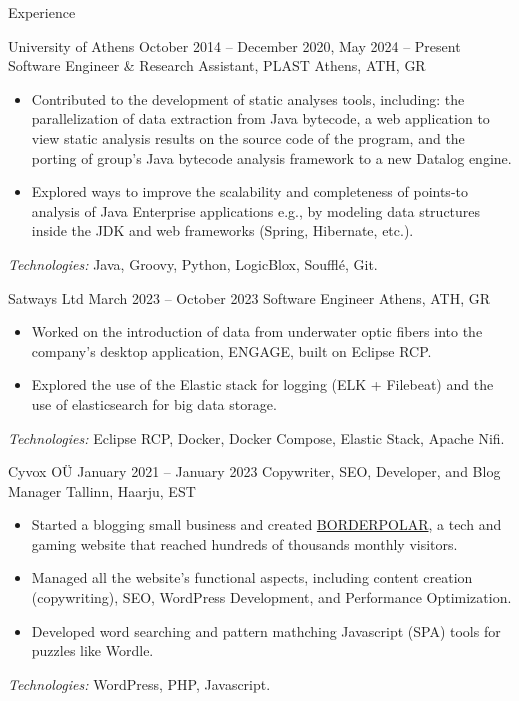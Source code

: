 \documentclass{resume}
\begin{document}
\begin{rSection}{Experience}
  \begin{rSubsection}
    {University of Athens}
    {October 2014 -- December 2020, May 2024 -- Present}
    {Software Engineer \& Research Assistant, PLAST}
    {Athens, ATH, GR}
    \begin{itemize}[label={-}]
      \setlength\itemsep{-0.5em}
      \item Contributed to the development of static analyses tools, including: the parallelization of data extraction from Java bytecode, a web application to view static analysis results on the source code of the program, and the porting of group's Java bytecode analysis framework to a new Datalog engine.
      \item Explored ways to improve the scalability and completeness of points-to analysis of Java Enterprise applications e.g., by modeling data structures inside the JDK and web frameworks (Spring, Hibernate, etc.).
    \end{itemize}
    \footnotesize\textcolor{TechsColor}{\textit{Technologies:} Java, Groovy, Python, LogicBlox, Soufflé, Git.}
  \end{rSubsection}

  \begin{rSubsection}
    {Satways Ltd}
    {March 2023 -- October 2023}
    {Software Engineer}
    {Athens, ATH, GR}
    \begin{itemize}[label={-}]
      \setlength\itemsep{-0.5em}
        \item Worked on the introduction of data from underwater optic fibers into the company's desktop application, ENGAGE, built on Eclipse RCP.
        \item Explored the use of the Elastic stack for logging (ELK + Filebeat) and the use of elasticsearch for big data storage.
    \end{itemize}
    \footnotesize\textcolor{TechsColor}{\textit{Technologies:} Eclipse RCP, Docker, Docker Compose, Elastic Stack, Apache Nifi.}
  \end{rSubsection}

  \begin{rSubsection}
    {Cyvox OÜ}
    {January 2021 -- January 2023}
    {Copywriter, SEO, Developer, and Blog Manager}
    {Tallinn, Haarju, EST}
    \begin{itemize}[label={-}]
      \setlength\itemsep{-0.5em}
        \item Started a blogging small business and created \href{http://borderpolar.com}{BORDERPOLAR}, a tech and gaming website that reached hundreds of thousands monthly visitors.
        \item Managed all the website's functional aspects, including content creation (copywriting), SEO, WordPress Development, and Performance Optimization.
        \item Developed word searching and pattern mathching Javascript (SPA) tools for puzzles like Wordle.
    \end{itemize}
    \footnotesize\textcolor{TechsColor}{\textit{Technologies:} WordPress, PHP, Javascript.}
  \end{rSubsection}


\end{rSection}
\end{document}
